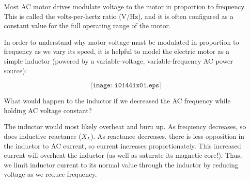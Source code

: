 

Most AC motor drives modulate voltage to the motor in proportion to frequency.  This is called the volts-per-hertz ratio (V/Hz), and it is often configured as a constant value for the full operating range of the motor. 

In order to understand why motor voltage must be modulated in proportion to frequency as we vary its speed, it is helpful to model the electric motor as a simple inductor (powered by a variable-voltage, variable-frequency AC power source):

$$\texttt{[image: i01441x01.eps]}$$

What would happen to the inductor if we decreased the AC frequency while holding AC voltage constant? 







The inductor would most likely overheat and burn up.  As frequency decreases, so does inductive reactance ($X_L$).  As reactance decreases, there is less opposition in the inductor to AC current, so current increases proportionately.  This increased current will overheat the inductor (as well as saturate its magnetic core!).  Thus, we limit inductor current to its normal value through the inductor by reducing voltage as we reduce frequency.












